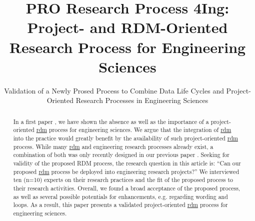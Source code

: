 \documentclass{bausteinefdm}
\title{PRO Research Process 4Ing: Project- and RDM-Oriented\\ Research Process for Engineering Sciences}
\subtitle{Validation of a Newly Prosed Process to Combine Data Life Cycles and Project-Oriented Research Processes in Engineering Sciences}
\begin{document}
\maketitle
\begin{abstract}
In a first paper \cite{Hamann.2024b}, we have shown the absence as well as the importance of a project-oriented \hyperref[Glossary:research data management level]{\ac{rdm}} process for engineering sciences.
We argue that the integration of \hyperref[Glossary:research data management level]{\ac{rdm}} into the practice would greatly benefit by the availability of such project-oriented \hyperref[Glossary:research data management level]{\ac{rdm}} process.
While many \hyperref[Glossary:research data management level]{\ac{rdm}} and engineering research processes already exist, a combination of both was only recently designed in our previous paper \cite{Hamann.2024b}.
Seeking for validity of the proposed RDM process, the research question in this article is: \enquote{Can our proposed \hyperref[Glossary:research data management level]{\ac{rdm}} process be deployed into engineering research projects?}
We interviewed ten (n=10) experts on their research practices and the fit of the proposed process to their research activities.
Overall, we found a broad acceptance of the proposed process, as well as several possible potentials for enhancements, e.g. regarding wording and loops.
As a result, this paper presents a validated project-oriented \hyperref[Glossary:research data management level]{\ac{rdm}} process for engineering sciences.
\end{abstract}

\linenumbers
\end{document}
